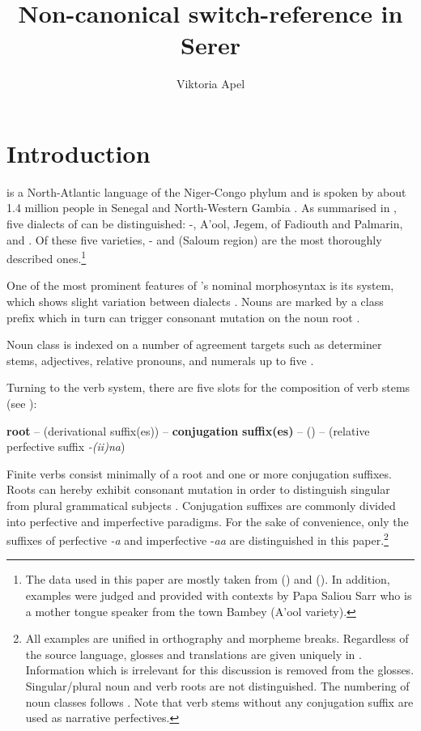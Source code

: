 \documentclass[output=paper,newtxmath,modfonts,nonflat,hidelinks]{langsci/langscibook}
\title{Non-canonical switch-reference in Serer}
\author{Viktoria Apel\affiliation{Humboldt-Universität zu Berlin}}
\begin{document}
\maketitle

\section{Introduction}

 is a North-Atlantic language of the Niger-Congo phylum \citep{Segerer2016} and is spoken by about 1.4 million people in Senegal and North-Western Gambia \citep{SimonsFenning2017}. As summarised in \citet[4]{Renaudier2012}, five dialects of  can be distinguished: -,  A’ool,  Jegem,  of Fadiouth and Palmarin, and  . Of these five varieties, - and   (Saloum region) are the most thoroughly described ones.\footnote{The data used in this paper are mostly taken from \citet{Faye1979} () and \citet{Renaudier2012} (). In addition, examples were judged and provided with contexts by Papa Saliou Sarr who is a mother tongue speaker from the town Bambey (A’ool variety).}

One of the most prominent features of ’s nominal morphosyntax is its  system, which shows slight variation between dialects \citep[see][]{Renaudier2015}. Nouns are marked by a class prefix which in turn can trigger consonant mutation on the noun root \citep{Faye05,McLaughlin94,McLaughlin00,Merrill14,Pozdniakov2006}.

Noun class is indexed on a number of agreement targets such as determiner stems, adjectives, relative pronouns, and numerals up to five \citep[493]{Renaudier2015}.

Turning to the verb system, there are five slots for the composition of verb stems (see \citealt[][90]{FayeMous06}):

\ea\label{ex:apel:1}
\glt \textbf{root} – (derivational suffix(es)) – \textbf{conjugation} \textbf{suffix(es)} –   () – (relative perfective suffix \textit{-(ii)na})
\z

Finite verbs consist minimally of a root and one or more conjugation suffixes. Roots can hereby exhibit consonant mutation in order to distinguish singular from plural grammatical subjects \citep{McLaughlin94,McLaughlin00}. Conjugation suffixes are commonly divided into perfective and imperfective paradigms. For the sake of convenience, only the suffixes of perfective \textit{-a}  and imperfective -\textit{aa}  are distinguished in this paper.\footnote{All examples are unified in orthography and morpheme breaks. Regardless of the source language, glosses and translations are given uniquely in . Information which is irrelevant for this discussion is removed from the glosses. Singular/plural noun and verb roots are not distinguished. The numbering of noun classes follows \citet[118]{Faye1979}. Note that verb stems without any conjugation suffix are used as narrative perfectives.} 
\end{document}
